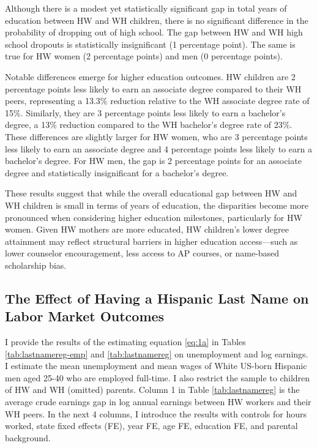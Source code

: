 Although there is a modest yet statistically significant gap in total years of education between HW and WH children, there is no significant difference in the probability of dropping out of high school. The gap between HW and WH high school dropouts is statistically insignificant (1 percentage point). The same is true for HW women (2 percentage points) and men (0 percentage points).

Notable differences emerge for higher education outcomes. HW children are 2 percentage points less likely to earn an associate degree compared to their WH peers, representing a 13.3\% reduction relative to the WH associate degree rate of 15\%. Similarly, they are 3 percentage points less likely to earn a bachelor's degree, a 13\% reduction compared to the WH bachelor's degree rate of 23\%. These differences are slightly larger for HW women, who are 3 percentage points less likely to earn an associate degree and 4 percentage points less likely to earn a bachelor’s degree. For HW men, the gap is 2 percentage points for an associate degree and statistically insignificant for a bachelor’s degree.

These results suggest that while the overall educational gap between HW and WH children is small in terms of years of education, the disparities become more pronounced when considering higher education milestones, particularly for HW women. Given HW mothers are more educated, HW children's lower degree attainment may reflect structural barriers in higher education access---such as lower counselor encouragement, less access to AP courses, or name-based scholarship bias.

\subsection{The Effect of Having a Hispanic Last Name on Labor Market Outcomes}

I provide the results of the estimating equation \ref{eq:1a} in Tables \ref{tab:lastnamereg-emp} and \ref{tab:lastnamereg} on unemployment and log earnings. I estimate the mean unemployment and mean wages of White US-born Hispanic men aged 25-40 who are employed full-time. I also restrict the sample to children of HW and WH (omitted) parents.  Column 1 in Table \ref{tab:lastnamereg} is the average crude earnings gap in log annual earnings between HW workers and their WH peers. In the next 4 columns, I introduce the results with controls for hours worked, state fixed effects (FE), year FE, age FE, education FE, and parental background.

